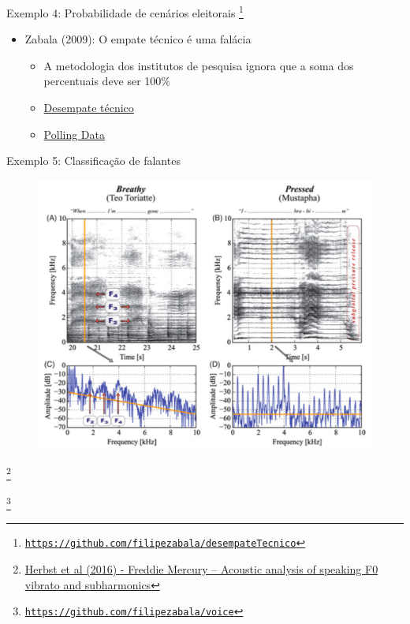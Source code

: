 \documentclass{beamer}
\newcommand\blfootnote[1]{%
  \begingroup
  \renewcommand\thefootnote{}\footnote{#1}%
  \addtocounter{footnote}{-1}%
  \endgroup
}
\begin{document}
\begin{frame}{Exemplo 4: Probabilidade de cenários eleitorais}
\blfootnote{\tiny{\href{https://github.com/filipezabala/desempateTecnico}{\nolinkurl{https://github.com/filipezabala/desempateTecnico}}}}
\begin{itemize}
\item Zabala (2009): O empate técnico é uma falácia
  \begin{itemize}
  \pause
  \item A metodologia dos institutos de pesquisa ignora que a soma dos percentuais deve ser 100\%
  \pause
  \item \href{http://www.filipezabala.com/cursos/dt.html}{Desempate técnico}
  \pause
  \item \href{http://www.pollingdata.com.br/}{Polling Data}
  \end{itemize}
\end{itemize}
\end{frame}

\begin{frame}{Exemplo 5: Classificação de falantes}
\begin{figure}
\includegraphics[scale=0.23]{freddie}
\end{figure}
\blfootnote{\tiny{\href{https://www.tandfonline.com/doi/abs/10.3109/14015439.2016.1156737}{Herbst et al (2016) - Freddie Mercury – Acoustic analysis of speaking F0 vibrato and subharmonics}}}
\blfootnote{\tiny{\href{https://github.com/filipezabala/voice}{\nolinkurl{https://github.com/filipezabala/voice}}}}
\end{frame}
\end{document}

